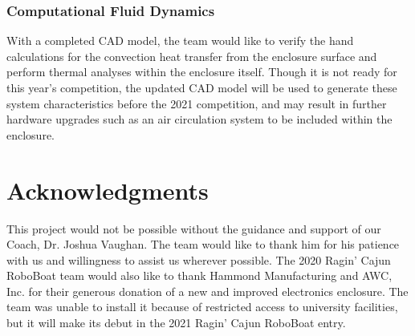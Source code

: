 \documentclass[letterpaper, 12 pt, conference]{ieeeconf}
\begin{document}
\subsubsection{Computational Fluid Dynamics}
With a completed CAD model, the team would like to verify the hand calculations for the convection heat transfer from the enclosure surface and perform thermal analyses within the enclosure itself. Though it is not ready for this year's competition, the updated CAD model will be used to generate these system characteristics before the 2021 competition, and may result in further hardware upgrades such as an air circulation system to be included within the enclosure.

\section{Acknowledgments}
This project would not be possible without the guidance and support of our Coach, Dr. Joshua Vaughan. The team would like to thank him for his patience with us and willingness to assist us wherever possible. The 2020 Ragin' Cajun RoboBoat team would also like to thank Hammond Manufacturing and AWC, Inc. for their generous donation of a new and improved electronics enclosure. The team was unable to install it because of restricted access to university facilities, but it will make its debut in the 2021 Ragin' Cajun RoboBoat entry.


\end{document}

